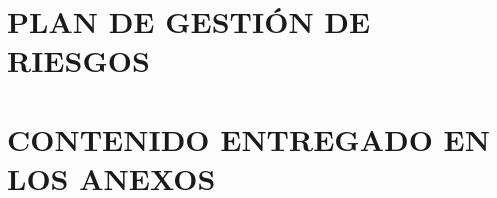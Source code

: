 \label{anexo:plan_de_gestion_de_riesgos}
\section*{PLAN DE GESTIÓN DE RIESGOS}




\newpage
{}
{}
\section*{CONTENIDO ENTREGADO EN LOS ANEXOS} 
